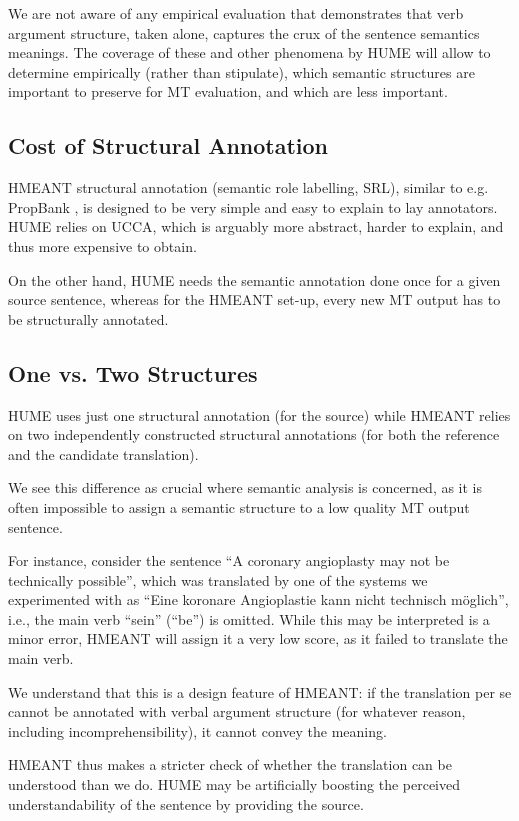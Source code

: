 \documentclass[11pt]{article}
\def\parcite#1{\cite{#1}}
\begin{document}
We are not aware of any empirical evaluation that demonstrates that verb argument structure,
taken alone, captures the crux of the sentence semantics meanings.
The coverage of
these and other phenomena by HUME will allow to determine empirically
(rather than stipulate), which semantic structures are important
to preserve for MT evaluation, and which are less important.


\subsection{Cost of Structural Annotation}

HMEANT structural annotation (semantic role labelling, SRL), similar to e.g.
PropBank
\parcite{palmer2010semantic}, is designed to be very simple and easy to explain
to lay annotators.
HUME relies on UCCA, which is arguably more abstract, harder to
explain, and thus more expensive to obtain.

On the other hand, HUME 
needs the semantic annotation
done once for a given source sentence, whereas for the HMEANT set-up, every new
MT output has to be structurally annotated.

\subsection{One vs. Two Structures}

HUME uses just one structural annotation (for the source) while HMEANT relies on
two independently constructed structural annotations (for both the reference and
the candidate translation).

We see this difference as crucial where semantic analysis is concerned, as it
is often impossible to assign a semantic structure to a low quality MT output sentence.

For instance, consider the sentence ``A coronary angioplasty may not be technically possible'',
which was translated by one of the systems we experimented with as
``Eine koronare Angioplastie kann nicht technisch m{\"o}glich'', i.e., the main verb ``sein'' (``be'') is omitted.
While this may be interpreted is a minor error, HMEANT will assign it a very low score, as it failed to
translate the main verb.

We understand that this is a design feature of HMEANT:
if the translation per se cannot be annotated with verbal argument structure
(for whatever reason, including incomprehensibility), it cannot convey the meaning.

HMEANT thus makes a stricter check of whether the translation can be understood
than we do. HUME may be artificially boosting the perceived understandability of
the sentence by providing the source.
\end{document}
